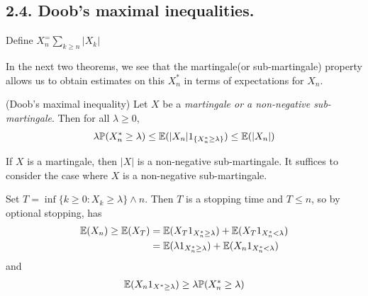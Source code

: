 \documentclass[10pt,a4paper]{report}
\newenvironment{proof}
{\begin{changemargin}{1cm}{0.5cm} 
	}%
	{\end{changemargin}
}
\begin{document}
\subsection*{2.4. Doob's maximal inequalities.}

\quad Define $X_n^ = \sum_{k\geq n} |X_k|$
\s

In the next two theorems, we see that the martingale(or sub-martingale) property allows us to obtain estimates on this $X_n^*$ in terms of expectations for $X_n$.\\
\s

 (Doob's maximal inequality) Let $X$ be a \emph{martingale or a non-negative sub-martingale}. Then for all $\lambda \geq 0$,
\begin{align*}
\lambda \mathbb{P}(X_n^* \geq \lambda) \leq \mathbb{E}(|X_n|   1_{\{ X_n^*\geq \lambda \}}) \leq \mathbb{E}(|X_n|)
\end{align*}
\begin{proof}
\pf If $X$ is a martingale, then $|X|$ is a non-negative sub-martingale. It suffices to consider the case where $X$ is a non-negative sub-martingale.

\quad Set $T = \inf \{ k \geq 0 : X_k \geq \lambda \} \wedge n$. Then $T$ is a stopping time and $T\leq n$, so by optional stopping, has
\begin{align*}
\mathbb{E}(X_n) \geq \mathbb{E}(X_T) &= \mathbb{E}(X_T 1_{X^*_n \geq \lambda}) + \mathbb{E}(X_T 1_{X^*_n < \lambda}) \\
& = \mathbb{E}( \lambda 1_{X^*_n \geq \lambda})  + \mathbb{E}(X_n 1_{X_n^* < \lambda})
\end{align*}
and
\begin{align*}
\mathbb{E}(X_n 1_{X^* \geq \lambda}) \geq \lambda \mathbb{P}(X^*_n \geq \lambda)
\end{align*}

\eop
\end{proof}
\s
\end{document}
